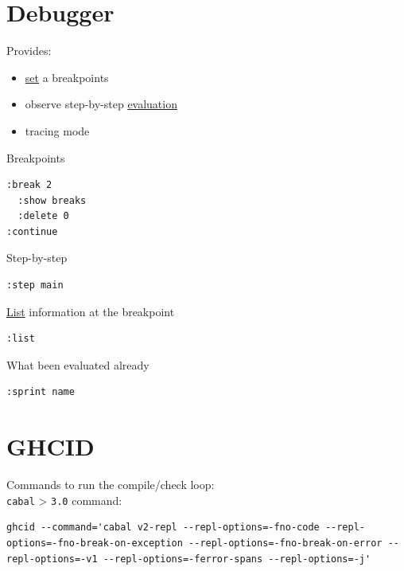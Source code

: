 \documentclass[a4paper,14pt,oneside]{book}
\begin{document}
{\chapter{Debugger}
\label{sec:org6438238}

Provides:\\
\begin{itemize}
\item \hyperref[org0726f94]{set} a breakpoints\\
\item observe step-by-step \hyperref[orga750944]{evaluation}\\
\item tracing mode\\
\end{itemize}

Breakpoints\\
\begin{verbatim}
:break 2
  :show breaks
  :delete 0
:continue
\end{verbatim}

Step-by-step\\
\begin{verbatim}
:step main
\end{verbatim}

\hyperref[org47d56c8]{List} information at the breakpoint\\
\begin{verbatim}
:list
\end{verbatim}

What been evaluated already\\
\begin{verbatim}
:sprint name
\end{verbatim}

\chapter{\label{org5beb1d0}GHCID}
\label{sec:orgc6b33d3}

Commands to run the compile/check loop:\\

\texttt{cabal} > \texttt{3.0} command:\\
\begin{verbatim}
ghcid --command='cabal v2-repl --repl-options=-fno-code --repl-options=-fno-break-on-exception --repl-options=-fno-break-on-error --repl-options=-v1 --repl-options=-ferror-spans --repl-options=-j'
\end{verbatim}

}
\end{document}
